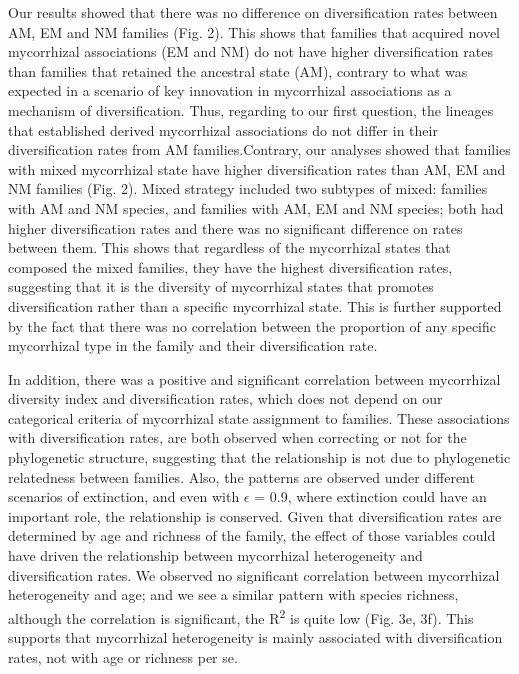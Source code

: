 \documentclass[12pt,]{article}
\begin{document}
Our results showed that there was no difference on diversification rates
between AM, EM and NM families (Fig. 2). This shows that families that
acquired novel mycorrhizal associations (EM and NM) do not have higher
diversification rates than families that retained the ancestral state
(AM), contrary to what was expected in a scenario of key innovation in
mycorrhizal associations as a mechanism of diversification. Thus,
regarding to our first question, the lineages that established derived
mycorrhizal associations do not differ in their diversification rates
from AM families.Contrary, our analyses showed that families with mixed
mycorrhizal state have higher diversification rates than AM, EM and NM
families (Fig. 2). Mixed strategy included two subtypes of mixed:
families with AM and NM species, and families with AM, EM and NM
species; both had higher diversification rates and there was no
significant difference on rates between them. This shows that regardless
of the mycorrhizal states that composed the mixed families, they have
the highest diversification rates, suggesting that it is the diversity
of mycorrhizal states that promotes diversification rather than a
specific mycorrhizal state. This is further supported by the fact that
there was no correlation between the proportion of any specific
mycorrhizal type in the family and their diversification rate.

In addition, there was a positive and significant correlation between
mycorrhizal diversity index and diversification rates, which does not
depend on our categorical criteria of mycorrhizal state assignment to
families. These associations with diversification rates, are both
observed when correcting or not for the phylogenetic structure,
suggesting that the relationship is not due to phylogenetic relatedness
between families. Also, the patterns are observed under different
scenarios of extinction, and even with \(\epsilon\) = 0.9, where
extinction could have an important role, the relationship is conserved.
Given that diversification rates are determined by age and richness of
the family, the effect of those variables could have driven the
relationship between mycorrhizal heterogeneity and diversification
rates. We observed no significant correlation between mycorrhizal
heterogeneity and age; and we see a similar pattern with species
richness, although the correlation is significant, the
R\textsuperscript{2} is quite low (Fig. 3e, 3f). This supports that
mycorrhizal heterogeneity is mainly associated with diversification
rates, not with age or richness per se.
\end{document}

